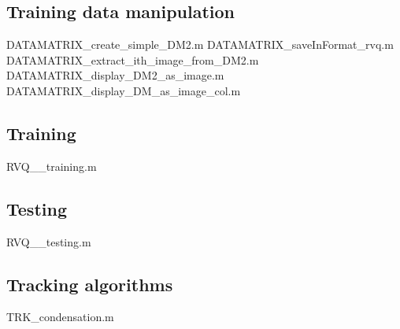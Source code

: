 \documentclass[12pt]{article}
\begin{document}
\subsection{Training data manipulation}
				{DATAMATRIX_create_simple_DM2.m}
				{DATAMATRIX_saveInFormat_rvq.m}
	{DATAMATRIX_extract_ith_image_from_DM2.m}
			{DATAMATRIX_display_DM2_as_image.m}
		{DATAMATRIX_display_DM_as_image_col.m}



\newpage
\subsection{Training}
									{RVQ__training.m}


\newpage
\subsection{Testing}
									{RVQ__testing.m}


\newpage
\subsection{Tracking algorithms}
								{TRK_condensation.m}



\newpage
\end{document}
